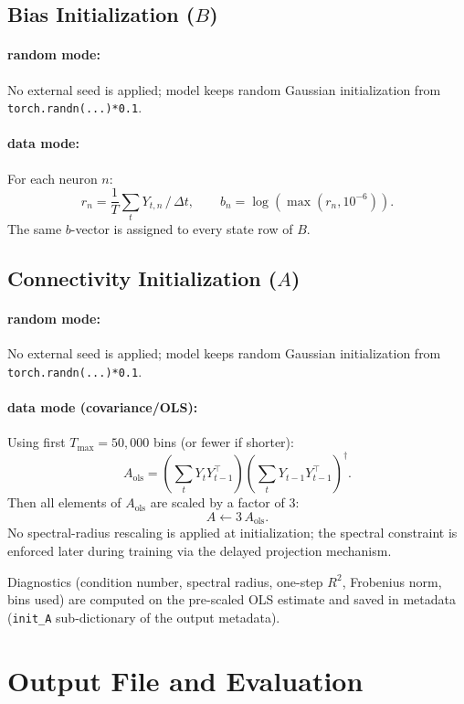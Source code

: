 \documentclass[11pt]{article}
\begin{document}
\subsection{Bias Initialization (\(B\))}

\paragraph{random mode:}
No external seed is applied; model keeps random Gaussian initialization from
\texttt{torch.randn(...)*0.1}.

\paragraph{data mode:}
For each neuron \(n\):
\[
r_n = \frac{1}{T}\sum_t Y_{t,n}\,/\,\Delta t,\qquad
b_n = \log(\max(r_n,10^{-6})).
\]
The same \(b\)-vector is assigned to every state row of \(B\).

\subsection{Connectivity Initialization (\(A\))}

\paragraph{random mode:}
No external seed is applied; model keeps random Gaussian initialization from
\texttt{torch.randn(...)*0.1}.

\paragraph{data mode (covariance/OLS):}
Using first \(T_{\max}=50{,}000\) bins (or fewer if shorter):
\[
A_{\mathrm{ols}}
=
\left(\sum_t Y_tY_{t-1}^\top\right)
\left(\sum_t Y_{t-1}Y_{t-1}^\top\right)^{\dagger}.
\]
Then all elements of \(A_{\mathrm{ols}}\) are scaled by a factor of 3:
\[
A \leftarrow 3\,A_{\mathrm{ols}}.
\]
No spectral-radius rescaling is applied at initialization; the spectral constraint is enforced later during training via the delayed projection mechanism.

Diagnostics (condition number, spectral radius, one-step \(R^2\), Frobenius norm,
bins used) are computed on the pre-scaled OLS estimate and saved in metadata
(\texttt{init\_A} sub-dictionary of the output metadata).

\section{Output File and Evaluation}
\label{sec:output}
\end{document}
